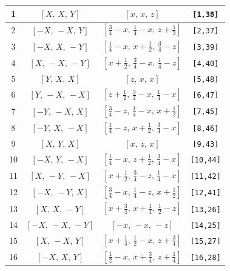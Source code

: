 \documentclass[fleqn,8pt]{jsarticle}
\begin{document}
\begin{longtable}{cccc}
1 & $\left[ X,\, X,\, Y \right]$ & $\left[ x,\, x,\, z \right]$ & {\tt [1,38]} \\ \hline
2 & $\left[ - X,\, - X,\, Y \right]$ & $\left[ \frac{3}{4} - x,\, \frac{1}{4} - x,\, z + \frac{1}{2} \right]$ & {\tt [2,37]} \\ \hline
3 & $\left[ - X,\, X,\, - Y \right]$ & $\left[ \frac{1}{4} - x,\, x + \frac{1}{2},\, \frac{3}{4} - z \right]$ & {\tt [3,39]} \\ \hline
4 & $\left[ X,\, - X,\, - Y \right]$ & $\left[ x + \frac{1}{2},\, \frac{3}{4} - x,\, \frac{1}{4} - z \right]$ & {\tt [4,40]} \\ \hline
5 & $\left[ Y,\, X,\, X \right]$ & $\left[ z,\, x,\, x \right]$ & {\tt [5,48]} \\ \hline
6 & $\left[ Y,\, - X,\, - X \right]$ & $\left[ z + \frac{1}{2},\, \frac{3}{4} - x,\, \frac{1}{4} - x \right]$ & {\tt [6,47]} \\ \hline
7 & $\left[ - Y,\, - X,\, X \right]$ & $\left[ \frac{3}{4} - z,\, \frac{1}{4} - x,\, x + \frac{1}{2} \right]$ & {\tt [7,45]} \\ \hline
8 & $\left[ - Y,\, X,\, - X \right]$ & $\left[ \frac{1}{4} - z,\, x + \frac{1}{2},\, \frac{3}{4} - x \right]$ & {\tt [8,46]} \\ \hline
9 & $\left[ X,\, Y,\, X \right]$ & $\left[ x,\, z,\, x \right]$ & {\tt [9,43]} \\ \hline
10 & $\left[ - X,\, Y,\, - X \right]$ & $\left[ \frac{1}{4} - x,\, z + \frac{1}{2},\, \frac{3}{4} - x \right]$ & {\tt [10,44]} \\ \hline
11 & $\left[ X,\, - Y,\, - X \right]$ & $\left[ x + \frac{1}{2},\, \frac{3}{4} - z,\, \frac{1}{4} - x \right]$ & {\tt [11,42]} \\ \hline
12 & $\left[ - X,\, - Y,\, X \right]$ & $\left[ \frac{3}{4} - x,\, \frac{1}{4} - z,\, x + \frac{1}{2} \right]$ & {\tt [12,41]} \\ \hline
13 & $\left[ X,\, X,\, - Y \right]$ & $\left[ x + \frac{3}{4},\, x + \frac{1}{4},\, \frac{1}{2} - z \right]$ & {\tt [13,26]} \\ \hline
14 & $\left[ - X,\, - X,\, - Y \right]$ & $\left[ - x,\, - x,\, - z \right]$ & {\tt [14,25]} \\ \hline
15 & $\left[ X,\, - X,\, Y \right]$ & $\left[ x + \frac{1}{4},\, \frac{1}{2} - x,\, z + \frac{3}{4} \right]$ & {\tt [15,27]} \\ \hline
16 & $\left[ - X,\, X,\, Y \right]$ & $\left[ \frac{1}{2} - x,\, x + \frac{3}{4},\, z + \frac{1}{4} \right]$ & {\tt [16,28]} \\ \hline

\end{longtable}
\end{document}
